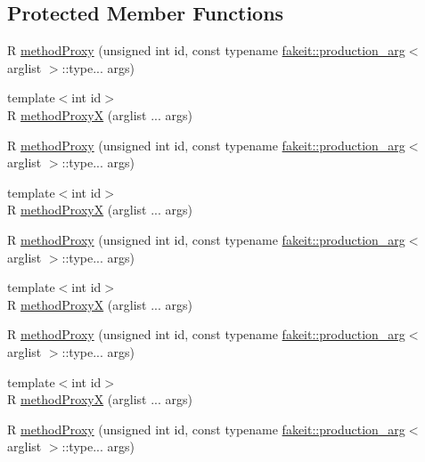 \subsection*{Protected Member Functions}
\begin{DoxyCompactItemize}
\item 
R \mbox{\hyperlink{classfakeit_1_1MethodProxyCreator_a84cda851ca570b88485bee657d21f76d}{method\+Proxy}} (unsigned int id, const typename \mbox{\hyperlink{structfakeit_1_1production__arg}{fakeit\+::production\+\_\+arg}}$<$ arglist $>$\+::type... args)
\item 
{\footnotesize template$<$int id$>$ }\\R \mbox{\hyperlink{classfakeit_1_1MethodProxyCreator_a5fe41e265c086e63b835a8467b9536ed}{method\+ProxyX}} (arglist ... args)
\item 
R \mbox{\hyperlink{classfakeit_1_1MethodProxyCreator_a84cda851ca570b88485bee657d21f76d}{method\+Proxy}} (unsigned int id, const typename \mbox{\hyperlink{structfakeit_1_1production__arg}{fakeit\+::production\+\_\+arg}}$<$ arglist $>$\+::type... args)
\item 
{\footnotesize template$<$int id$>$ }\\R \mbox{\hyperlink{classfakeit_1_1MethodProxyCreator_a5fe41e265c086e63b835a8467b9536ed}{method\+ProxyX}} (arglist ... args)
\item 
R \mbox{\hyperlink{classfakeit_1_1MethodProxyCreator_a84cda851ca570b88485bee657d21f76d}{method\+Proxy}} (unsigned int id, const typename \mbox{\hyperlink{structfakeit_1_1production__arg}{fakeit\+::production\+\_\+arg}}$<$ arglist $>$\+::type... args)
\item 
{\footnotesize template$<$int id$>$ }\\R \mbox{\hyperlink{classfakeit_1_1MethodProxyCreator_a5fe41e265c086e63b835a8467b9536ed}{method\+ProxyX}} (arglist ... args)
\item 
R \mbox{\hyperlink{classfakeit_1_1MethodProxyCreator_a84cda851ca570b88485bee657d21f76d}{method\+Proxy}} (unsigned int id, const typename \mbox{\hyperlink{structfakeit_1_1production__arg}{fakeit\+::production\+\_\+arg}}$<$ arglist $>$\+::type... args)
\item 
{\footnotesize template$<$int id$>$ }\\R \mbox{\hyperlink{classfakeit_1_1MethodProxyCreator_a5fe41e265c086e63b835a8467b9536ed}{method\+ProxyX}} (arglist ... args)
\item 
R \mbox{\hyperlink{classfakeit_1_1MethodProxyCreator_a84cda851ca570b88485bee657d21f76d}{method\+Proxy}} (unsigned int id, const typename \mbox{\hyperlink{structfakeit_1_1production__arg}{fakeit\+::production\+\_\+arg}}$<$ arglist $>$\+::type... args)

\end{DoxyCompactItemize}
